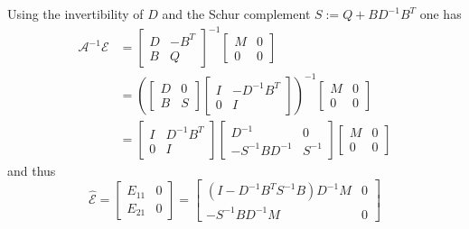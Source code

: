 \documentclass[a4paper,10pt,BCOR=15mm]{scrbook}
\begin{document}
Using the invertibility of $D$ and the Schur complement $S:=Q+BD^{-1}B^T$ one has
\begin{align*}
 \mathcal{A}^{-1}\mathcal E &= \begin{bmatrix} D&  -B^T  \\ B&  Q \end{bmatrix}^{-1} \begin{bmatrix} M& 0 \\ 0& 0 \end{bmatrix} \\
&= \left (\begin{bmatrix} D&  0  \\ B& S \end{bmatrix}\begin{bmatrix} I&  -D^{-1}B^T  \\ 0&  I \end{bmatrix}\right ) ^{-1}\begin{bmatrix} M& 0 \\ 0& 0 \end{bmatrix} \\
&=\begin{bmatrix} I&  D^{-1}B^T  \\ 0&  I \end{bmatrix} \begin{bmatrix} D^{-1}&  0  \\ -S^{-1}BD^{-1}& S^{-1} \end{bmatrix} \begin{bmatrix} M& 0 \\ 0& 0 \end{bmatrix}
\end{align*}
and thus
\begin{equation}\label{ehat}
 \hat{\mathcal{E}}=\begin{bmatrix} E_{11}& 0 \\ E_{21} & 0 \end{bmatrix} = \begin{bmatrix} (I-D^{-1}B^TS^{-1}B)D^{-1}M & 0 \\ -S^{-1}BD^{-1}M & 0 \end{bmatrix}
\end{equation}
\end{document}
